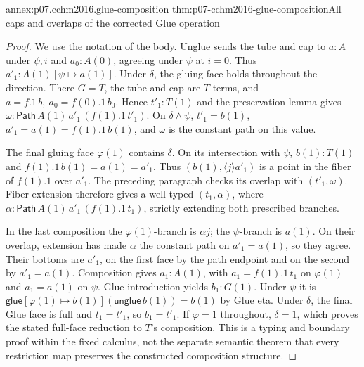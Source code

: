 \begin{annexitem}{annex:p07.cchm2016.glue-composition}
 {thm:p07-cchm2016-glue-composition}{All caps and overlaps of the corrected Glue operation}
\begin{proof}
We use the notation of the body.  Unglue sends the tube and cap to
\(a:A\) under \(\psi,i\) and \(a_0:A(0)\), agreeing under \(\psi\)
at \(i=0\).  Thus \(a'_1:A(1)[\psi\mapsto a(1)]\).
Under \(\delta\), the gluing face holds throughout the direction.
There \(G=T\), the tube and cap are \(T\)-terms, and
\(a=f.1\,b,\ a_0=f(0).1\,b_0\).  Hence \(t'_1:T(1)\) and the
preservation lemma gives
\(\omega:\mathsf{Path}\,A(1)\,a'_1\,(f(1).1\,t'_1)\).
On \(\delta\wedge\psi\), \(t'_1=b(1)\), \(a'_1=a(1)=f(1).1\,b(1)\),
and \(\omega\) is the constant path on this value.

The final gluing face \(\varphi(1)\) contains \(\delta\).
On its intersection with \(\psi\), \(b(1):T(1)\) and
\(f(1).1\,b(1)=a(1)=a'_1\).  Thus
\((b(1),\langle j\rangle a'_1)\) is a point in the fiber of \(f(1).1\)
over \(a'_1\).  The preceding paragraph checks its overlap with
\((t'_1,\omega)\).  Fiber extension therefore gives a well-typed
\((t_1,\alpha)\), where
\(\alpha:\mathsf{Path}\,A(1)\,a'_1\,(f(1).1\,t_1)\), strictly
extending both prescribed branches.

In the last composition the \(\varphi(1)\)-branch is \(\alpha j\);
the \(\psi\)-branch is \(a(1)\).  On their overlap, extension has made
\(\alpha\) the constant path on \(a'_1=a(1)\), so they agree.
Their bottoms are \(a'_1\), on the first face by the path endpoint
and on the second by \(a'_1=a(1)\).
Composition gives \(a_1:A(1)\), with \(a_1=f(1).1\,t_1\) on
\(\varphi(1)\) and \(a_1=a(1)\) on \(\psi\).
Glue introduction yields \(b_1:G(1)\).
Under \(\psi\) it is
\(\mathsf{glue}[\varphi(1)\mapsto b(1)]
(\mathsf{unglue}\,b(1))=b(1)\) by Glue eta.
Under \(\delta\), the final Glue face is full and \(t_1=t'_1\),
so \(b_1=t'_1\).
If \(\varphi=1\) throughout, \(\delta=1\), which proves the stated
full-face reduction to \(T\)'s composition.
This is a typing and boundary proof within the fixed calculus, not
the separate semantic theorem that every restriction map preserves
the constructed composition structure.
\end{proof}
\end{annexitem}

